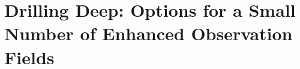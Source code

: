 \chapter[Deep Drilling Fields]{Drilling Deep: Options for a Small Number of Enhanced Observation
Fields}
\label{chp:deepdrilling}




% 


% 

